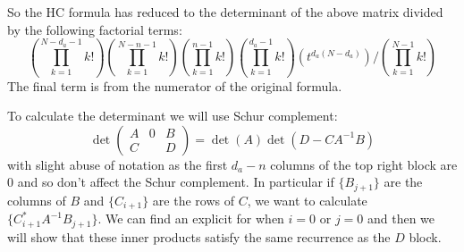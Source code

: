 \documentclass{article}
\begin{document}
So the HC formula has reduced to the determinant of the above matrix divided by the following factorial terms:
\[ \left( \prod_{k=1}^{N-d_{a}-1} k! \right) \left( \prod_{k=1}^{N-n-1} k! \right) \left( \prod_{k=1}^{n-1} k! \right) \left( \prod_{k=1}^{d_{a}-1} k! \right) \left( t^{d_{a}(N-d_{a})} \right) / \left( \prod_{k=1}^{N-1} k! \right)     \]
The final term is from the numerator of the original formula. 


To calculate the determinant we will use Schur complement:
\[ \det \begin{pmatrix} A & 0 & B
\\ C & & D
\end{pmatrix} = \det(A) \det(D - C A^{-1} B)    \]
with slight abuse of notation as the first $d_{a} - n$ columns of the top right block are $0$ and so don't affect the Schur complement. In particular if $\{B_{j+1}\}$ are the columns of $B$ and $\{C_{i+1}\}$ are the rows of $C$, we want to calculate $\{ C_{i+1}^{*} A^{-1} B_{j+1} \}$. We can find an explicit for when $i=0$ or $j=0$ and then we will show that these inner products satisfy the same recurrence as the $D$ block. 
\end{document}
